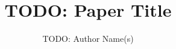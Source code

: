 \documentclass[10pt]{article}
\title{TODO: Paper Title}
\author{TODO: Author Name(s)}
\date{}
\begin{document}
\maketitle

\begin{abstract}
\end{abstract}








\end{document}
